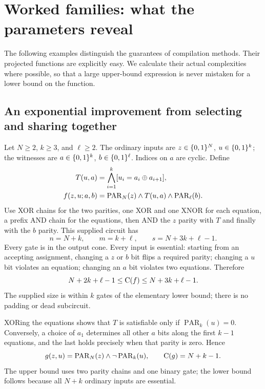 \section{Worked families: what the parameters reveal}
\label{sec:worked-coverage}

The following examples distinguish the guarantees of compilation methods.
Their projected functions are explicitly easy. We calculate their actual
complexities where possible, so that a large upper-bound expression is
never mistaken for a lower bound on the function.

\subsection{An exponential improvement from selecting and sharing together}

Let $N\ge2$, $k\ge3$, and $\ell\ge2$. The ordinary inputs are
$z\in\{0,1\}^N$, $u\in\{0,1\}^k$; the witnesses are $a\in\{0,1\}^k$,
$b\in\{0,1\}^\ell$. Indices on $a$ are cyclic. Define
\begin{align}
 T(u,a)&=\bigwedge_{i=1}^k[u_i=a_i\oplus a_{i+1}],\label{eq:cyclic-check}\\
 f(z,u;a,b)&=\operatorname{PAR}_N(z)\land T(u,a)
                         \land\operatorname{PAR}_\ell(b).
                         \label{eq:cyclic-verifier}
\end{align}
Use XOR chains for the two parities, one XOR and one XNOR for each
equation, a prefix AND chain for the equations, then AND the $z$ parity
with $T$ and finally with the $b$ parity. This supplied circuit has
\[
 n=N+k,\qquad m=k+\ell,\qquad s=N+3k+\ell-1.
\]
Every gate is in the output cone. Every input is essential: starting
from an accepting assignment, changing a $z$ or $b$ bit flips a required
parity; changing a $u$ bit violates an equation; changing an $a$ bit
violates two equations. Therefore
\[
 N+2k+\ell-1\le\mathrm{C}(f)\le N+3k+\ell-1.
\]
The supplied size is within $k$ gates of the elementary lower bound;
there is no padding or dead subcircuit.

XORing the equations shows that $T$ is satisfiable only if
$\operatorname{PAR}_k(u)=0$. Conversely, a choice of $a_1$ determines
all other $a$ bits along the first $k-1$ equations, and the last holds
precisely when that parity is zero. Hence
\begin{equation}\label{eq:cyclic-projection}
 g(z,u)=\operatorname{PAR}_N(z)\land\neg\operatorname{PAR}_k(u),
 \qquad \mathrm{C}(g)=N+k-1.
\end{equation}
The upper bound uses two parity chains and one binary gate; the lower
bound follows because all $N+k$ ordinary inputs are essential.

